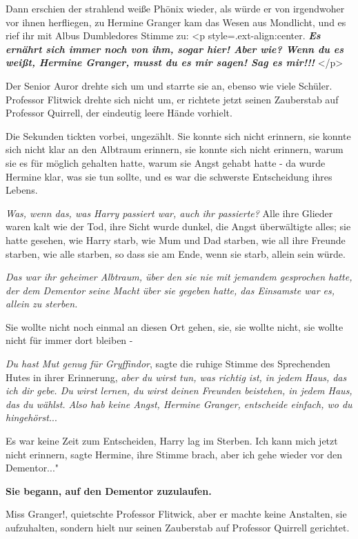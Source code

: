 Dann erschien der strahlend weiße Phönix wieder, als würde er von irgendwoher
vor ihnen herfliegen, zu Hermine Granger kam das Wesen aus Mondlicht, und es
rief ihr mit Albus Dumbledores Stimme zu: <p
style=\grqq{}.ext-align:center\grqq{}. \textbf{\emph{ \glqq{}Es ernährt sich
immer noch von ihm, sogar hier! Aber wie? Wenn du es weißt, Hermine Granger,
musst du es mir sagen! Sag es mir!!!\grqq{}} }</p>

Der Senior Auror drehte sich um und starrte sie an, ebenso wie viele Schüler.
Professor Flitwick drehte sich nicht um, er richtete jetzt seinen Zauberstab auf
Professor Quirrell, der eindeutig leere Hände vorhielt.

Die Sekunden tickten vorbei, ungezählt. Sie konnte sich nicht erinnern, sie
konnte sich nicht klar an den Albtraum erinnern, sie konnte sich nicht erinnern,
warum sie es für möglich gehalten hatte, warum sie Angst gehabt hatte - da wurde
Hermine klar, was sie tun sollte, und es war die schwerste Entscheidung ihres
Lebens.

\emph{Was, wenn das, was Harry passiert war, auch ihr passierte?}
Alle ihre Glieder waren kalt wie der Tod, ihre Sicht wurde dunkel, die Angst
überwältigte alles; sie hatte gesehen, wie Harry starb, wie Mum und Dad starben,
wie all ihre Freunde starben, wie alle starben, so dass sie am Ende, wenn sie
starb, allein sein würde.

\emph{Das war ihr geheimer Albtraum, über den sie nie mit jemandem gesprochen
hatte, der dem Dementor seine Macht über sie gegeben hatte, das Einsamste war
es, allein zu sterben.}

Sie wollte nicht noch einmal an diesen Ort gehen, sie, sie wollte nicht, sie
wollte nicht für immer dort bleiben -

\emph{Du hast Mut genug für Gryffindor}, sagte die ruhige Stimme des Sprechenden
Hutes in ihrer Erinnerung, \emph{aber du wirst tun, was richtig ist, in jedem
Haus, das ich dir gebe. Du wirst lernen, du wirst deinen Freunden beistehen, in
jedem Haus, das du wählst. Also hab keine Angst, Hermine Granger, entscheide
einfach, wo du hingehörst.}..

Es war keine Zeit zum Entscheiden, Harry lag im Sterben. \glqq{}Ich kann mich
jetzt nicht erinnern\grqq{}, sagte Hermine, ihre Stimme brach, \glqq{}aber ich
gehe wieder vor den Dementor..."

\textbf{ Sie begann, auf den Dementor zuzulaufen.}

\glqq{}Miss Granger!\grqq{}, quietschte Professor Flitwick, aber er machte keine
Anstalten, sie aufzuhalten, sondern hielt nur seinen Zauberstab auf Professor
Quirrell gerichtet.

